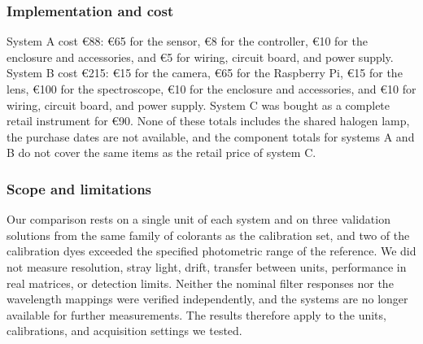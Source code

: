 \subsubsection{Implementation and cost}\label{sec4.1}

System A cost \euro{}88: \euro{}65 for the sensor, \euro{}8 for the controller, \euro{}10 for the enclosure and accessories, and \euro{}5 for wiring, circuit board, and power supply. System B cost \euro{}215: \euro{}15 for the camera, \euro{}65 for the Raspberry Pi, \euro{}15 for the lens, \euro{}100 for the spectroscope, \euro{}10 for the enclosure and accessories, and \euro{}10 for wiring, circuit board, and power supply. System C was bought as a complete retail instrument for \euro{}90. None of these totals includes the shared halogen lamp, the purchase dates are not available, and the component totals for systems A and B do not cover the same items as the retail price of system C.

\subsubsection{Scope and limitations}\label{sec:caselim}

Our comparison rests on a single unit of each system and on three validation solutions from the same family of colorants as the calibration set, and two of the calibration dyes exceeded the specified photometric range of the reference. We did not measure resolution, stray light, drift, transfer between units, performance in real matrices, or detection limits. Neither the nominal filter responses nor the wavelength mappings were verified independently, and the systems are no longer available for further measurements. The results therefore apply to the units, calibrations, and acquisition settings we tested.
\FloatBarrier
